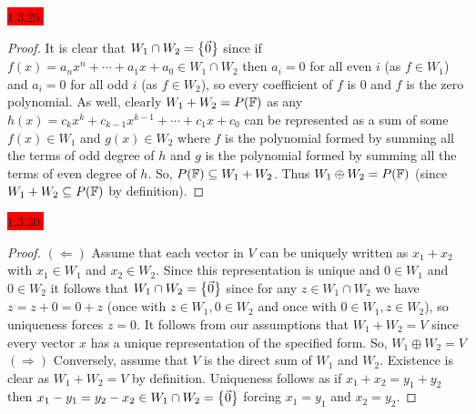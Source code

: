 \documentclass{exam}
\begin{document}
  \colorbox{red}{\underline{$1.3.25$}:}
  \begin{solution}
    \begin{proof}
      It is clear that $W_1 \cap W_2 = \left\{\vec{0} \right\}$ since if $f(x) = a_nx^n + \cdots + a_1x + a_0 \in W_1 \cap W_2$ then $a_i = 0$ for all even $i$ (as $f \in W_1$) and $a_i = 0$ for all odd $i$ (as $f \in W_2$), so every coefficient of $f$ is $0$ and $f$ is the zero polynomial. As well, clearly $W_1 + W_2 = P(\mathbb F)$ as any $h(x) = c_k x^k + c_{k-1}x^{k-1} + \cdots + c_1 x + c_0$ can be represented as a sum of some $f(x) \in W_1$ and $g(x) \in W_2$ where $f$ is the polynomial formed by summing all the terms of odd degree of $h$ and $g$ is the polynomial formed by summing all the terms of even degree of $h$. So, $P(\mathbb F) \subseteq W_1 + W_2$. Thus $W_1 \oplus W_2 = P(\mathbb F)$ (since $W_1 + W_2 \subseteq P(\mathbb F)$ by definition).
    \end{proof}
  \end{solution}

  \colorbox{red}{\underline{$1.3.30$}:}
  \begin{solution}
    \begin{proof}
      $(\Leftarrow)$ Assume that each vector in $V$ can be uniquely written as $x_1 + x_2$ with $x_1 \in W_1$ and $x_2 \in W_2$. Since this representation is unique and $0 \in W_1$ and $0 \in W_2$ it follows that $W_1 \cap W_2 = \left\{\vec{0} \right\}$ since for any $z \in W_1 \cap W_2$ we have $z = z + 0 = 0 + z$ (once with $z \in W_1, 0 \in W_2$ and once with $0 \in W_1, z \in W_2$), so uniqueness forces $z = 0$. It follows from our assumptions that $W_1 + W_2 = V$ since every vector $x$ has a unique representation of the specified form. So, $W_1 \oplus W_2 = V$ \\
      $(\Rightarrow)$ Conversely, assume that $V$ is the direct sum of $W_1$ and $W_2$. Existence is clear as $W_1 + W_2 = V$ by definition. Uniqueness follows as if $x_1 + x_2 = y_1 + y_2$ then $x_1 - y_1 = y_2 - x_2 \in W_1 \cap W_2 = \left\{\vec{0} \right\}$ forcing $x_1 = y_1$ and $x_2 = y_2$.
    \end{proof}
  \end{solution}
\end{document}

